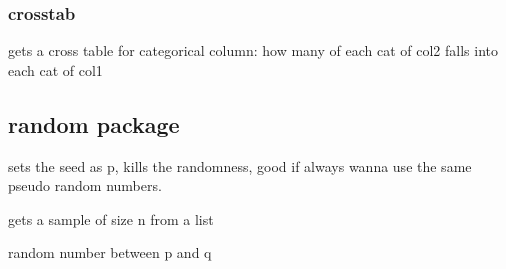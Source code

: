 


		\subsubsection{crosstab}
			\label{stats:panda:crosstab}

			 gets a cross table for categorical column: how many of each cat of col2 falls into each cat of col1


	\subsection{random package}


		 sets the seed as p, kills the randomness, good if always wanna use the same pseudo random numbers.

		 gets a sample of size n from a list

		 random number between p and q

